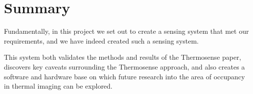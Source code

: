 \documentclass[../thesis/thesis.tex]{subfiles}
\begin{document}
\section{Summary}
Fundamentally, in this project we set out to create a sensing system that met our requirements, and we have indeed created such a sensing system.

This system both validates the methods and results of the Thermosense paper, discovers key caveats surrounding the Thermosense approach, and also creates a software and hardware base on which future research into the area of occupancy in thermal imaging can be explored.
 
\end{document}
